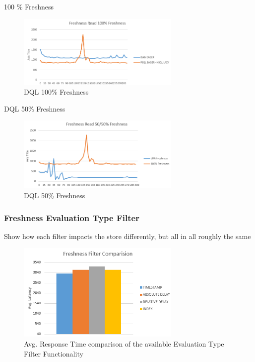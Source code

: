 100 \% Freshness
\begin{figure}[t] 
    \centering 
    \includegraphics[width=0.7\textwidth]{Figures/100_fresh_dql.PNG}
    \caption{DQL 100\% Freshness }
    \label{fig:fresh100}
\end{figure}


DQL 50\% Freshness
\begin{figure}[t] 
    \centering 
    \includegraphics[width=0.7\textwidth]{Figures/50_fresh_dql.PNG}
    \caption{DQL 50\% Freshness}
    \label{fig:fresh50}
\end{figure}





\subsubsection{Freshness Evaluation Type Filter} 
Show how each filter impacts the store differently, but all in all roughly the same
\begin{figure}[t] 
    \centering 
    \includegraphics[width=0.7\textwidth]{Figures/freshness_comp.PNG}
    \caption{Avg. Response Time comparison of the available Evaluation Type Filter Functionality }
    \label{fig:eval_type}
\end{figure}


